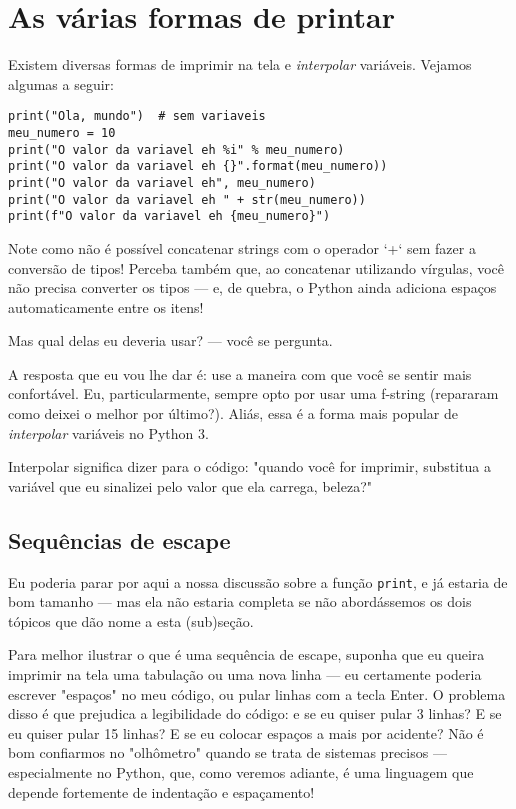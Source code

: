\documentclass[12pt]{book}
\begin{document}
	\newpage
	\section{As várias formas de printar}
	
	Existem diversas formas de imprimir na tela e \textit{interpolar} variáveis. Vejamos algumas a seguir:
	
	\begin{lstlisting}[caption={Os vários jeitos de printar em Python}]
print("Ola, mundo")  # sem variaveis
meu_numero = 10
print("O valor da variavel eh %i" % meu_numero)
print("O valor da variavel eh {}".format(meu_numero))
print("O valor da variavel eh", meu_numero)
print("O valor da variavel eh " + str(meu_numero))
print(f"O valor da variavel eh {meu_numero}")\end{lstlisting}
	
	Note como não é possível concatenar strings com o operador `+` sem fazer a conversão de tipos! Perceba também que, ao concatenar utilizando vírgulas, você não precisa converter os tipos — e, de quebra, o Python ainda adiciona espaços automaticamente entre os itens!
	
	Mas qual delas eu deveria usar? — você se pergunta.
	
	A resposta que eu vou lhe dar é: use a maneira com que você se sentir mais confortável. Eu, particularmente, sempre opto por usar uma f-string (repararam como deixei o melhor por último?). Aliás, essa é a forma mais popular de \textit{interpolar} variáveis no Python 3.
	
	\begin{tcolorbox}[colback=gray!10, colframe=black, title={\large\bfseries Observação}]
		Interpolar significa dizer para o código: "quando você for imprimir, substitua a variável que eu sinalizei pelo valor que ela carrega, beleza?"
	\end{tcolorbox}
	
	\subsection{Sequências de escape}
	
	Eu poderia parar por aqui a nossa discussão sobre a função \texttt{print}, e já estaria de bom tamanho — mas ela não estaria completa se não abordássemos os dois tópicos que dão nome a esta (sub)seção.
	
	Para melhor ilustrar o que é uma sequência de escape, suponha que eu queira imprimir na tela uma tabulação ou uma nova linha — eu certamente poderia escrever "espaços" no meu código, ou pular linhas com a tecla Enter. O problema disso é que prejudica a legibilidade do código: e se eu quiser pular 3 linhas? E se eu quiser pular 15 linhas? E se eu colocar espaços a mais por acidente? Não é bom confiarmos no "olhômetro" quando se trata de sistemas precisos — especialmente no Python, que, como veremos adiante, é uma linguagem que depende fortemente de indentação e espaçamento!
	
\end{document}
